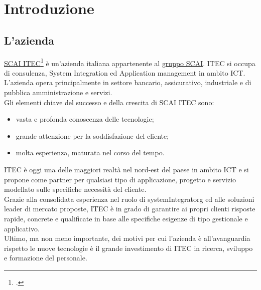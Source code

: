 
\chapter{Introduzione}
\label{cap:introduzione}





\section{L'azienda}

\href{https://scaiitec.it/}{SCAI ITEC\footcite{SCAI ITEC abbrev: ITEC} } è un'azienda italiana appartenente al \href{https://www.grupposcai.it/}{gruppo SCAI}. ITEC si occupa di consulenza, System Integration ed Application management in ambito ICT. L'azienda opera principalmente in settore bancario, assicurativo, industriale e di pubblica amministrazione e servizi. \\Gli elementi chiave del successo e della crescita di SCAI ITEC sono:
\begin{itemize}
    \item vasta e profonda conoscenza delle tecnologie;
    \item grande attenzione per la soddisfazione del cliente;
    \item molta esperienza, maturata nel corso del tempo.
\end{itemize} 
ITEC è oggi una delle maggiori realtà nel nord-est del paese in ambito ICT e si propone come partner per qualsiasi tipo di applicazione, progetto e servizio modellato sulle specifiche necessità del cliente. 
\\Grazie alla consolidata esperienza nel ruolo di \gls{systemIntegratorg}\glsfirstoccur{} ed alle soluzioni leader di mercato proposte, ITEC è in grado di garantire ai propri clienti risposte rapide, concrete e qualificate in base alle specifiche esigenze di tipo gestionale e applicativo.
\\Ultimo, ma non meno importante, dei motivi per cui l'azienda è all'avanguardia rispetto le nuove tecnologie è il grande investimento di ITEC in ricerca, sviluppo e formazione del personale.

